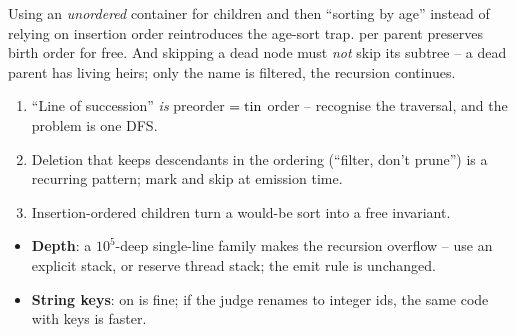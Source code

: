 
\begin{warningbox}
Using an \emph{unordered} container for children and then ``sorting by age'' instead of
relying on insertion order reintroduces the age-sort trap.  per parent
preserves birth order for free. And skipping a dead node must \emph{not} skip its subtree --
a dead parent has living heirs; only the name is filtered, the recursion continues.
\end{warningbox}

\begin{insightbox}
\begin{enumerate}[nosep, leftmargin=1.6em]
  \item ``Line of succession'' \emph{is} preorder $=\operatorname{tin}$ order -- recognise the traversal,
        and the problem is one DFS.
  \item Deletion that keeps descendants in the ordering (``filter, don't prune'') is a
        recurring pattern; mark and skip at emission time.
  \item Insertion-ordered children turn a would-be sort into a free invariant.
\end{enumerate}
\end{insightbox}

\begin{hardeningbox}
\begin{itemize}[nosep, leftmargin=1.4em]
  \item \textbf{Depth}: a $10^5$-deep single-line family makes the recursion overflow -- use
        an explicit stack, or reserve thread stack; the emit rule is unchanged.
  \item \textbf{String keys}:  on  is fine; if the judge
        renames to integer ids, the same code with  keys is faster.
\end{itemize}
\end{hardeningbox}

